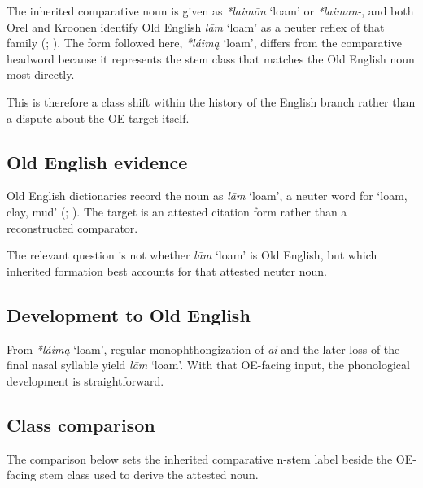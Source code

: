 \documentclass[
  british,
  a4paper,
  openany]{book}
\providecommand{\Recon}[1]{\emph{*#1}}
{\catcode`→=\active \global\def→{\ensuremath{\rightarrow}}}
\providecommand{\Recon}[1]{\emph{*#1}}
{\catcode`→=\active \global\def→{\ensuremath{\rightarrow}}}
\begin{document}
The inherited comparative noun is given as \Recon{laimōn} `loam' or
\emph{*laiman-}, and both Orel and Kroonen identify Old English
\emph{lām} `loam' as a neuter reflex of that family
(;
). The form followed here,
\Recon{láimą} `loam', differs from the comparative headword because it
represents the stem class that matches the Old English noun most
directly.

This is therefore a class shift within the history of the English branch
rather than a dispute about the OE target itself.

\subsection{Old English evidence}\label{old-english-evidence-87}

Old English dictionaries record the noun as \emph{lām} `loam', a neuter
word for `loam, clay, mud' (; ). The target is an attested citation form rather than a
reconstructed comparator.

The relevant question is not whether \emph{lām} `loam' is Old English,
but which inherited formation best accounts for that attested neuter
noun.

\subsection{Development to Old
English}\label{development-to-old-english-87}

From \Recon{láimą} `loam', regular monophthongization of \emph{ai} and
the later loss of the final nasal syllable yield \emph{lām} `loam'. With
that OE-facing input, the phonological development is straightforward.

\subsection{Class comparison}\label{class-comparison-3}

The comparison below sets the inherited comparative n-stem label beside
the OE-facing stem class used to derive the attested noun.
\end{document}
